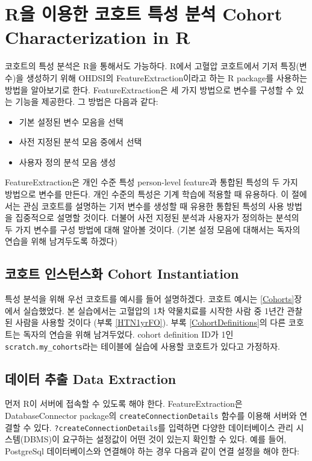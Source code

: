 \documentclass[10.5pt]{book}
\providecommand{\tightlist}{%
  \setlength{\itemsep}{0pt}\setlength{\parskip}{0pt}}
\theoremstyle{definition}
\theoremstyle{definition}
\theoremstyle{definition}
\theoremstyle{remark}
\begin{document}
\section{R을 이용한 코호트 특성 분석 Cohort Characterization in
R}\label{r-----cohort-characterization-in-r}

코호트의 특성 분석은 R을 통해서도 가능하다. R에서 고혈압 코호트에서 기저
특징(변수)을 생성하기 위해 OHDSI의 FeatureExtraction이라고 하는 R
package를 사용하는 방법을 알아보기로 한다. FeatureExtraction은 세 가지
방법으로 변수를 구성할 수 있는 기능을 제공한다. 그 방법은 다음과 같다:

\begin{itemize}
\tightlist
\item
  기본 설정된 변수 모음을 선택
\item
  사전 지정된 분석 모음 중에서 선택
\item
  사용자 정의 분석 모음 생성
\end{itemize}

FeatureExtraction은 개인 수준 특성 person-level feature과 통합된 특성의
두 가지 방법으로 변수를 만든다. 개인 수준의 특성은 기계 학습에 적용할 때
유용하다. 이 절에서는 관심 코호트를 설명하는 기저 변수를 생성할 때
유용한 통합된 특성의 사용 방법을 집중적으로 설명할 것이다. 더불어 사전
지정된 분석과 사용자가 정의하는 분석의 두 가지 변수를 구성 방법에 대해
알아볼 것이다. (기본 설정 모음에 대해서는 독자의 연습을 위해 남겨두도록
하겠다)

\subsection{코호트 인스턴스화 Cohort
Instantiation}\label{--cohort-instantiation}

특성 분석을 위해 우선 코호트를 예시를 들어 설명하겠다. 코호트 예시는
\ref{Cohorts}장에서 실습했었다. 본 실습에서는 고혈압의 1차 약물치료를
시작한 사람 중 1년간 관찰된 사람을 사용할 것이다 (부록 \ref{HTN1yrFO}).
부록 \ref{CohortDefinitions}의 다른 코호트는 독자의 연습을 위해
남겨두었다. cohort definition ID가 1인 \texttt{scratch.my\_cohorts}라는
테이블에 실습에 사용할 코호트가 있다고 가정하자.

\subsection{데이터 추출 Data Extraction}\label{--data-extraction}

먼저 R이 서버에 접속할 수 있도록 해야 한다. FeatureExtraction은
DatabaseConnector package의 \texttt{createConnectionDetails} 함수를
이용해 서버와 연결할 수 있다. \texttt{?createConnectionDetails}를
입력하면 다양한 데이터베이스 관리 시스템(DBMS)이 요구하는 설정값이 어떤
것이 있는지 확인할 수 있다. 예를 들어, PostgreSql 데이터베이스와
연결해야 하는 경우 다음과 같이 연결 설정을 해야 한다:
\end{document}
